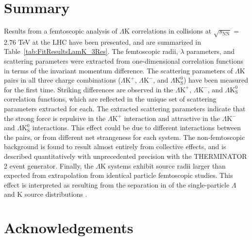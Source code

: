 \documentclass[ALICE,manyauthors]{cernphprep}
\newcommand{\ResultsDirBaseLamKch}{/home/jesse/Analysis/FemtoAnalysis/Results/Results_cLamcKch_20190319/}
\newcommand{\MomRes}{_MomResCrctn}%
\newcommand{\NonFlatBgdLamKch}{_NonFlatBgdCrctnLamK0LamKchPolynomial}
\newcommand{\ResNum}{_3Res}
\newcommand{\PrimMaxDecay}{_PrimMaxDecay10fm}
\newcommand{\ResMethod}{_UsingXiDataAndCoulombOnly}
\newcommand{\ParamFixAndShareLamKch}{_ShareLam_Dualie_ShareLam_ShareRadii}
\newcommand{\SaveNameModLamKch}{\MomRes\NonFlatBgdLamKch\ResNum\PrimMaxDecay\ResMethod\ParamFixAndShareLamKch}
\newcommand{\Lam}{$\Lambda$\xspace}
\newcommand{\LamK}{$\Lambda$K\xspace}
\newcommand{\LamKchP}{$\Lambda\mathrm{K^{+}}$\xspace}
\newcommand{\LamKchM}{$\Lambda\mathrm{K^{-}}$\xspace}
\newcommand{\LamKs}{$\Lambda\mathrm{K^{0}_{S}}$\xspace}
\begin{document}
\section{Summary}
\label{sec:Summary}



Results from a femtoscopic analysis of \LamK correlations in {\color{red}{Pb-Pb}} {\color{blue}{Pb--Pb}} collisions at $\sqrt{s_{\mathrm{NN}}}$ = 2.76 TeV {\color{red}{with ALICE}} {\color{blue}{measured by the ALICE experiment}} at the LHC have been presented, and are summarized in Table~\ref{tab:FitResultsLamK_3Res}.
The femtoscopic radii, $\lambda$ parameters, and scattering parameters were extracted from one-dimensional correlation functions in terms of the invariant momentum difference.
The scattering parameters of \LamK pairs in all three charge combinations (\LamKchP, \LamKchM, and \LamKs) have been measured for the first time.
Striking differences are observed in the \LamKchP, \LamKchM, and \LamKs correlation functions, which are reflected in the unique set of scattering parameters extracted for each.
The extracted scattering parameters indicate that the strong force is repulsive in the \LamKchP interaction and attractive in the \LamKchM and \LamKs interactions.
This effect could be due to different {\color{red}{quark-antiquark}} {\color{blue}{quark--antiquark}} interactions between the pairs, or from different net strangeness for each system. 
The non-femtoscopic background is found to result almost entirely from collective effects, and is described quantitatively with unprecedented precision with the THERMINATOR 2 event generator.
Finally, the \LamK systems exhibit source radii larger than expected from extrapolation from identical particle femtoscopic studies.
This effect is interpreted as resulting from the separation in {\color{red}{space-time}} {\color{blue}{space--time}} of the single-particle \Lam and K source distributions {\color{blue}{(i.e., the emission asymmetry of the source)}}.

\newenvironment{acknowledgement}{\relax}{\relax}
\begin{acknowledgement}
\section*{Acknowledgements}
\end{acknowledgement}
\end{document}
